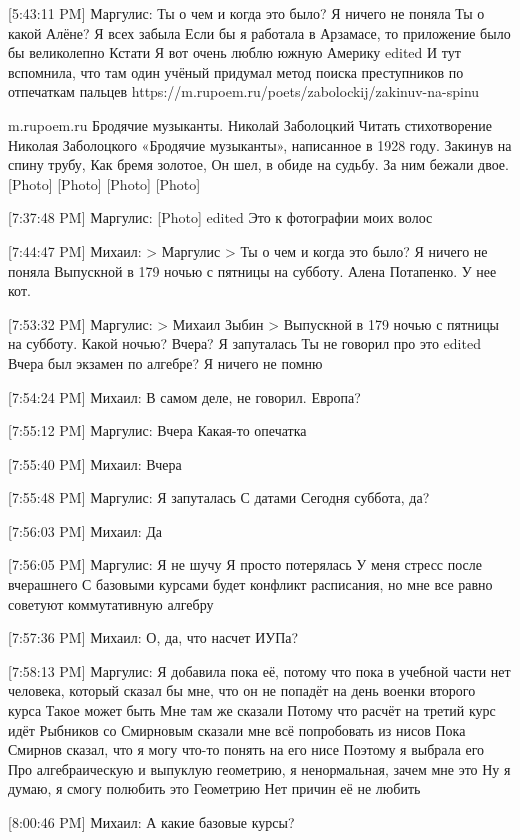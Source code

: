 \documentclass{article}
\begin{document}
[5:43:11 PM] Маргулис:
Ты о чем и когда это было? Я ничего не поняла
 Ты о какой Алёне?
 Я всех забыла
 Если бы я работала в Арзамасе, то приложение было бы великолепно
 Кстати
 Я вот очень люблю южную Америку
edited 
И тут вспомнила, что там один учёный придумал метод поиска преступников по отпечаткам пальцев
 https://m.rupoem.ru/poets/zabolockij/zakinuv-na-spinu

m.rupoem.ru
Бродячие музыканты. Николай Заболоцкий
Читать стихотворение Николая Заболоцкого «Бродячие музыканты», написанное в 1928 году. Закинув на спину трубу, Как бремя золотое, Он шел, в обиде на судьбу. За ним бежали двое.
 [Photo]
 [Photo]
 [Photo]
 [Photo]

[7:37:48 PM] Маргулис:
[Photo]
edited 
Это к фотографии моих волос

[7:44:47 PM] Михаил:
> Маргулис
> Ты о чем и когда это было? Я ничего не поняла
Выпускной в 179 ночью с пятницы на субботу.
 Алена Потапенко.
 У нее кот.

[7:53:32 PM] Маргулис:
> Михаил Зыбин
> Выпускной в 179 ночью с пятницы на субботу.
Какой ночью? Вчера?
 Я запуталась
 Ты не говорил про это
edited 
Вчера был экзамен по алгебре?
 Я ничего не помню

[7:54:24 PM] Михаил:
В самом деле, не говорил.
 Европа?

[7:55:12 PM] Маргулис:
Вчера
 Какая-то опечатка

[7:55:40 PM] Михаил:
Вчера

[7:55:48 PM] Маргулис:
Я запуталась
 С датами
 Сегодня суббота, да?

[7:56:03 PM] Михаил:
Да

[7:56:05 PM] Маргулис:
Я не шучу
 Я просто потерялась
 У меня стресс после вчерашнего
 С базовыми курсами будет конфликт расписания, но мне все равно советуют коммутативную алгебру

[7:57:36 PM] Михаил:
О, да, что насчет ИУПа?

[7:58:13 PM] Маргулис:
Я добавила пока её, потому что пока в учебной части нет человека, который сказал бы мне, что он не попадёт на день военки второго курса
 Такое может быть
 Мне там же сказали
 Потому что расчёт на третий курс идёт
 Рыбников со Смирновым сказали мне всё попробовать из нисов
 Пока Смирнов сказал, что я могу что-то понять на его нисе
 Поэтому я выбрала его
 Про алгебраическую и выпуклую геометрию, я ненормальная, зачем мне это
 Ну я думаю, я смогу полюбить это
 Геометрию
 Нет причин её не любить

[8:00:46 PM] Михаил:
А какие базовые курсы?
\end{document}
